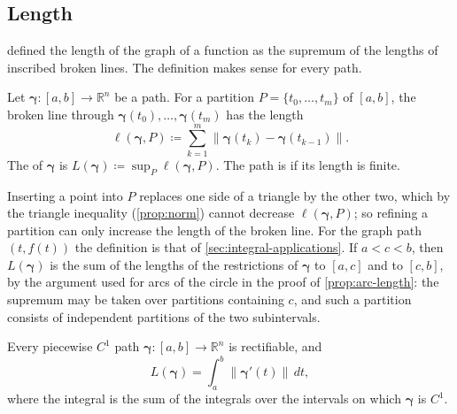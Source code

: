 \subsection{Length}

 defined the length of the graph of a function as the supremum of the lengths of inscribed broken lines. The definition makes sense for every path.

\begin{definition}
\label{def:path-length}
Let $\boldsymbol\gamma\colon[a,b]\to\mathbb R^n$ be a path. For a partition $P=\{t_0,\ldots,t_m\}$ of $[a,b]$, the broken line through $\boldsymbol\gamma(t_0),\ldots,\boldsymbol\gamma(t_m)$ has the length
\[
\ell(\boldsymbol\gamma,P)\coloneqq\sum_{k=1}^m\bigl\|\boldsymbol\gamma(t_k)-\boldsymbol\gamma(t_{k-1})\bigr\| .
\]
The  of $\boldsymbol\gamma$ is $L(\boldsymbol\gamma)\coloneqq\sup_P\ell(\boldsymbol\gamma,P)$. The path is  if its length is finite.
\end{definition}

Inserting a point into $P$ replaces one side of a triangle by the other two, which by the triangle inequality (\cref{prop:norm}) cannot decrease $\ell(\boldsymbol\gamma,P)$; so refining a partition can only increase the length of the broken line. For the graph path $(t,f(t))$ the definition is that of \cref{sec:integral-applications}. If $a<c<b$, then $L(\boldsymbol\gamma)$ is the sum of the lengths of the restrictions of $\boldsymbol\gamma$ to $[a,c]$ and to $[c,b]$, by the argument used for arcs of the circle in the proof of \cref{prop:arc-length}: the supremum may be taken over partitions containing $c$, and such a partition consists of independent partitions of the two subintervals.

\begin{theorem}
\label{thm:path-length}
Every piecewise $C^1$ path $\boldsymbol\gamma\colon[a,b]\to\mathbb R^n$ is rectifiable, and
\[
L(\boldsymbol\gamma)=\int_a^b\|\boldsymbol\gamma'(t)\|\,dt ,
\]
where the integral is the sum of the integrals over the intervals on which $\boldsymbol\gamma$ is $C^1$.
\end{theorem}

